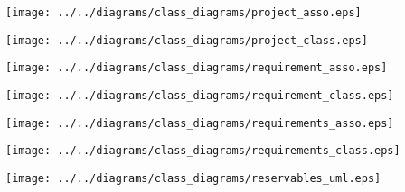     \begin{frame}
    \begin{center}
    \texttt{[image: ../../diagrams/class\_diagrams/project\_asso.eps]}
    \end{center}
    \end{frame}
    

    \begin{frame}
    \begin{center}
    \texttt{[image: ../../diagrams/class\_diagrams/project\_class.eps]}
    \end{center}
    \end{frame}
    

    \begin{frame}
    \begin{center}
    \texttt{[image: ../../diagrams/class\_diagrams/requirement\_asso.eps]}
    \end{center}
    \end{frame}
    

    \begin{frame}
    \begin{center}
    \texttt{[image: ../../diagrams/class\_diagrams/requirement\_class.eps]}
    \end{center}
    \end{frame}
    

    \begin{frame}
    \begin{center}
    \texttt{[image: ../../diagrams/class\_diagrams/requirements\_asso.eps]}
    \end{center}
    \end{frame}
    

    \begin{frame}
    \begin{center}
    \texttt{[image: ../../diagrams/class\_diagrams/requirements\_class.eps]}
    \end{center}
    \end{frame}
    

    \begin{frame}
    \begin{center}
    \texttt{[image: ../../diagrams/class\_diagrams/reservables\_uml.eps]}
    \end{center}
    \end{frame}
    

